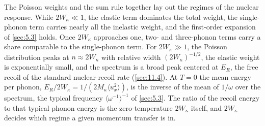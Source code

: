 The Poisson weights and the sum rule together lay out the regimes of the nuclear response. While $2W_\kappa \ll 1$, the elastic term dominates the total weight, the single-phonon term carries nearly all the inelastic weight, and the first-order expansion of \cref{sec:5.3} holds. Once $2W_\kappa$ approaches one, two- and three-phonon terms carry a share comparable to the single-phonon term. For $2W_\kappa \gg 1$, the Poisson distribution peaks at $n \approx 2W_\kappa$ with relative width $(2W_\kappa)^{-1/2}$, the elastic weight is exponentially small, and the spectrum is a broad peak centered at $E_R$, the free recoil of the standard nuclear-recoil rate (\cref{sec:11.4}). At $T = 0$ the mean energy per phonon, $E_R/2W_\kappa = 1/(2M_\kappa\langle u_x^2\rangle)$, is the inverse of the mean of $1/\omega$ over the spectrum, the typical frequency $\langle\omega^{-1}\rangle^{-1}$ of \cref{sec:5.3}. The ratio of the recoil energy to that typical phonon energy is the zero-temperature $2W_\kappa$ itself, and $2W_\kappa$ decides which regime a given momentum transfer is in.

